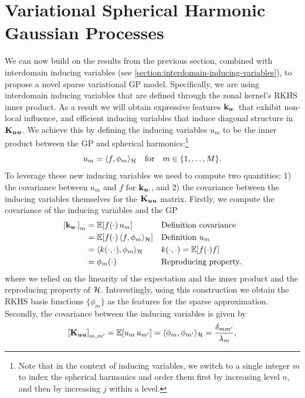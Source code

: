 \section{Variational Spherical Harmonic Gaussian Processes}
\label{sec:vish}

We can now build on the results from the previous section, combined with interdomain inducing variables (see \cref{section:interdomain-inducing-variables}), to propose a novel sparse variational GP model. Specifically, we are using interdomain inducing variables that are defined through the zonal kernel's RKHS inner product. As a result we will obtain expressive features $\mathbf{k}_{\bm{u} \cdot}$ that exhibit non-local influence, and efficient inducing variables that induce diagonal structure in $\mathbf{{K}}_{\bm{u} \bm{u}}$. We achieve this by defining the inducing variables $u_m$ to be the inner product between the GP and spherical harmonics:\footnote{Note that in the context of inducing variables, we switch to a single integer $m$ to index the spherical harmonics and order them first by increasing level $n$, and then by increasing $j$ within a level.}
\begin{equation}
  u_m = \langle f, \phi_m\rangle_{{\mathcal{H}}}\quad\text{for}\quad m \in \{1, \ldots, M\}.
\end{equation}
To leverage these new inducing variables we need to compute two quantities: 1) the covariance between $u_m$ and $f$ for $\mathbf{k}_{\bm{u} \cdot}$, and 2) the covariance between the inducing variables themselves for the $\mathbf{{K}}_{\bm{u} \bm{u}}$ matrix. Firstly, we compute the covariance of the inducing variables and the GP
\begin{align}
   \left[\kux \right]_m 
    &= \ExpSymb[f(\cdot)\,u_m] && \text{Definition covariance} \\
    &= \ExpSymb[f(\cdot)\,\langle f, \sh_m\rangle_{\rkhs}] && \text{Definition $u_m$} \\
    &= \langle k(\cdot, \cdot), \sh_m \rangle_{\rkhs}   && {k(\cdot, \cdot) = \ExpSymb[f(\cdot) f]} \\
    &= \phi_{m}(\cdot) && \text{Reproducing property.}
\end{align}
where we relied on the linearity of the expectation and the inner product and the reproducing property of ${\mathcal{H}}$. Interestingly, using this construction we obtain the RKHS basis functions $\{\phi_m\}$ as the features for the sparse approximation. Secondly, the covariance between the inducing variables is given by
\begin{equation}
    \left[\Kuu \right]_{m, m'} = \ExpSymb \left[u_m\,u_{m'} \right] 
    = \langle \sh_{m}, \sh_{m'} \rangle_{\rkhs} 
    = {\delta_{mm'} \over \lambda_m},
\end{equation}
